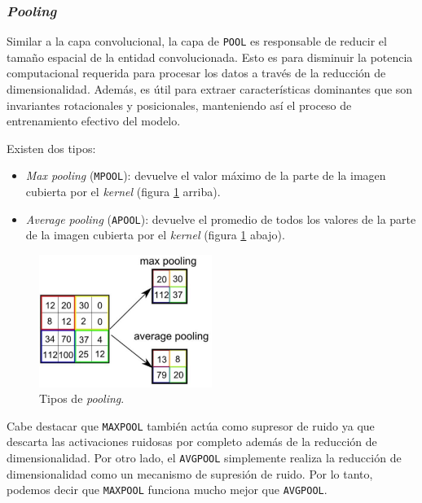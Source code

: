 \documentclass[a4paper,12pt]{article}
\begin{document}
\subsubsection{\textit{Pooling}}

Similar a la capa convolucional, la capa de \texttt{POOL} es responsable de reducir el tamaño espacial de la entidad convolucionada. Esto es para disminuir la potencia computacional requerida para procesar los datos a través de la reducción de dimensionalidad. Además, es útil para extraer características dominantes que son invariantes rotacionales y posicionales, manteniendo así el proceso de entrenamiento efectivo del modelo.

Existen dos tipos:
\begin{itemize}
	\item \textit{Max pooling} (\texttt{MPOOL}): devuelve el valor máximo de la parte de la imagen cubierta por el \textit{kernel} (figura \ref{fig:type-pooling} arriba).
	\item \textit{Average pooling} (\texttt{APOOL}): devuelve el promedio de todos los valores de la parte de la imagen cubierta por el \textit{kernel} (figura \ref{fig:type-pooling} abajo).
\end{itemize}

\begin{figure}[H]
	\begin{center}				
	\includegraphics[width=0.5\textwidth]{tesis_45.png}
  	\caption{Tipos de \textit{pooling}.}
  	\label{fig:type-pooling}
  	\end{center}
\end{figure}

Cabe destacar que \texttt{MAXPOOL} también actúa como supresor de ruido ya que descarta las activaciones ruidosas por completo además de la reducción de dimensionalidad. Por otro lado, el \texttt{AVGPOOL} simplemente realiza la reducción de dimensionalidad como un mecanismo de supresión de ruido. Por lo tanto, podemos decir que \texttt{MAXPOOL} funciona mucho mejor que \texttt{AVGPOOL}.
\end{document}
